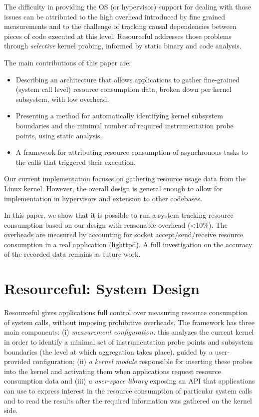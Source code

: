 \documentclass[letterpaper,twocolumn,10pt]{article}
\newcommand{\pname}{Resourceful}
\begin{document}
The difficulty in providing the OS (or hypervisor) support for dealing
with those issues can be attributed to the high overhead introduced by fine grained measurements and to the challenge of tracking causal dependencies between pieces of code executed at this level.
\pname{ }addresses those problems through \emph{selective} kernel probing, informed by static binary and code analysis.

The main contributions of this paper are: 

\begin{itemize} 
\item Describing an architecture that allows applications to gather fine-grained
(system call level) resource consumption data, broken down per kernel subsystem,
with low overhead.
\item Presenting a method for automatically identifying kernel subsystem
boundaries and the minimal number of required instrumentation probe points,
using static analysis.
\item A framework for attributing resource consumption of asynchronous
tasks to the calls that triggered their execution.
\end{itemize}

Our current implementation focuses on gathering resource usage data from the
Linux kernel.  However, the overall design is general enough to allow for
implementation in hypervisors and extension to other codebases. 

In this paper, we show that it is possible to run a system tracking resource
consumption based on our design with reasonable overhead (\textless 10\%). The
overheads are measured by accounting for socket accept/send/receive resource
consumption in a real application (lighttpd). A full
investigation on the accuracy of the recorded data remains as future work.


\section{\pname: System Design} 

\pname{ }gives applications full control over measuring resource consumption of
system calls, without imposing prohibitive overheads. The framework has three
main components: (i) \textit{measurement configuration:} this analyzes the
current kernel in order to identify a minimal set of instrumentation probe points and
subsystem boundaries (the level at which aggregation takes place), guided by a
user-provided configuration; (ii) \textit{a kernel module} responsible for
inserting these probes into the kernel and activating them when
applications request resource consumption data and (iii) \textit{a user-space
library} exposing an API that applications can use to express interest in the
resource consumption of particular system calls and to read the results after
the required information was gathered on the kernel side.
\end{document}
